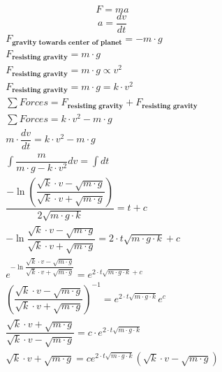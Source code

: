 \documentclass[12pt,letterpaper]{article}
\author{Shawn Hartley}
\begin{document}
\begin{equation}
F = ma
\end{equation}
\begin{equation}
a = \dfrac{dv}{dt}
\end{equation}
\[\begin{align}


F_{\textbf{gravity towards center of planet}} = -m\cdot g\\

F_{\textbf{resisting gravity}} = m\cdot g\\

F_{\textbf{resisting gravity}} = m\cdot g \propto v^{2}\\

F_{\textbf{resisting gravity}} = m\cdot g = k\cdot v^{2}\\

\sum Forces = F_{\textbf{resisting gravity}} + F_{\textbf{resisting gravity}}\\

\sum Forces = k\cdot v^{2} - m\cdot g\\

m\cdot \dfrac{dv}{dt} = k\cdot v^{2} - m\cdot g\\

\int \dfrac{m}{m\cdot g-k\cdot v^{2}}dv = \int dt\\

\dfrac{-\ln\left(\dfrac{\sqrt{k}\cdot v - \sqrt{m\cdot g}}{\sqrt{k}\cdot v + \sqrt{m\cdot g}}\right)}{2\sqrt{m\cdot g\cdot k}} = t + c\\

-\ln \dfrac{\sqrt{k}\cdot v - \sqrt{m\cdot g}}{\sqrt{k}\cdot v + \sqrt{m\cdot g}} = 2\cdot t\sqrt{m\cdot g\cdot k} + c \\

\textit{e}^{-\ln \dfrac{\sqrt{k}\cdot v - \sqrt{m\cdot g}}{\sqrt{k}\cdot v + \sqrt{m\cdot g}}} = \textit{e}^{2\cdot t\sqrt{m\cdot g\cdot k} + c}\\

\left(\dfrac{\sqrt{k}\cdot v - \sqrt{m\cdot g}}{\sqrt{k}\cdot v + \sqrt{m\cdot g}}\right)^{-1} = \textit{e}^{2\cdot t\sqrt{m\cdot g\cdot k}} \textit{e}^{c}\\

\dfrac{\sqrt{k}\cdot v + \sqrt{m\cdot g}}{\sqrt{k}\cdot v - \sqrt{m\cdot g}} = c\cdot \textit{e}^{2\cdot t\sqrt{m\cdot g\cdot k}}\\

\sqrt{k}\cdot v + \sqrt{m\cdot g} = c\textit{e}^{2\cdot t\sqrt{m\cdot g\cdot k}}(\sqrt{k}\cdot v - \sqrt{m\cdot g})\\


\end{align}\]
\end{document}
